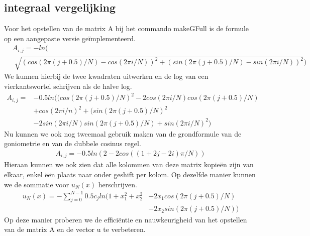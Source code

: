 \documentclass[a4paper]{article}
\begin{document}
\subsection*{integraal vergelijking}

Voor het opstellen van de matrix A bij het commando makeGFull is de formule op een aangepaste versie ge\"implementeerd.
\begin{equation}
\label{matA}
\begin{aligned}
	&A_{i,j} = -ln( \\ &\sqrt[]{(cos(2\pi (j+0.5)/N)-cos(2\pi i/N))^2
	 +(sin(2\pi (j+0.5)/N)-sin(2\pi i/N))^2})
\end{aligned}
\end{equation}
We kunnen hierbij de twee kwadraten uitwerken en de log van een vierkantswortel schrijven als de halve log.
\begin{equation}
\label{matAvoluit}
\begin{aligned}
	A_{i,j} = & -0.5ln((cos(2\pi (j+0.5)/N)^2-2cos(2\pi i/N)cos(2\pi (j+0.5)/N) \\ & + cos(2\pi i/n)^2
	 +(sin(2\pi (j+0.5)/N)^2 \\ & -2sin(2\pi i/N)sin(2\pi (j+0.5)/N)+sin(2\pi i/N)^2)
\end{aligned}
\end{equation}
Nu kunnen we ook nog tweemaal gebruik maken van de grondformule van de goniometrie en van de dubbele cosinus regel.
\begin{equation}
\label{matAkort}
\begin{aligned}
	A_{i,j} = -0.5ln(2 - 2cos((1+2j-2i)\pi/N))
\end{aligned}
\end{equation}
Hieraan kunnen we ook zien dat alle kolommen van deze matrix kopie\"en zijn van elkaar, enkel \"e\"en plaats naar onder geshift per kolom. Op dezelfde manier kunnen we de sommatie voor $u_N(x)$ herschrijven.
\begin{equation}
\label{un}
\begin{aligned}
	u_N(x) = -\sum_{j=0}^{N-1} 0.5c_jln(1+x_1^2+x_2^2 &-2x_1cos(2\pi (j+0.5)/N)\\&-2x_2sin(2\pi (j+0.5)/N))
\end{aligned}
\end{equation}
Op deze manier proberen we de effici\"entie en nauwkeurigheid van het opstellen van de matrix A en de vector u te verbeteren.
\end{document}

